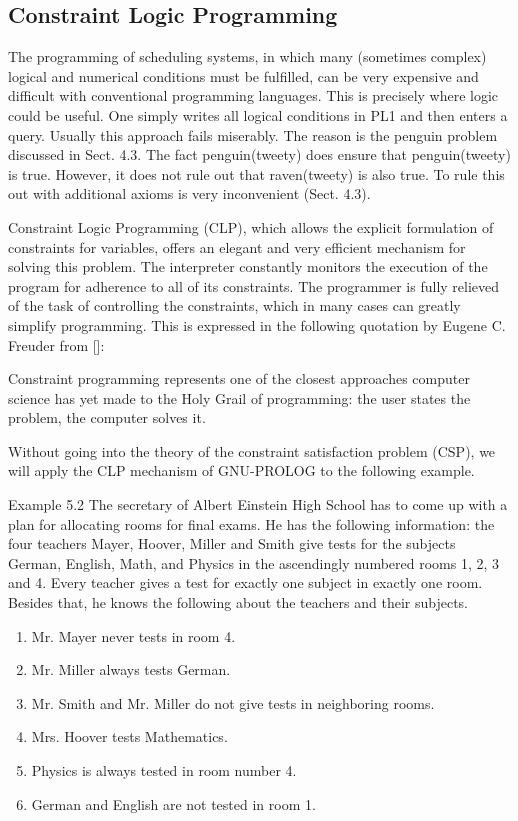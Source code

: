 \documentclass[10pt]{book}
\begin{document}
\subsection{Constraint Logic Programming}
The programming of scheduling systems, in which many (sometimes complex) logical and numerical conditions must be fulfilled, can be very expensive and difficult with conventional programming languages. This is precisely where logic could be useful. One simply writes all logical conditions in PL1 and then enters a query. Usually this approach fails miserably. The reason is the penguin problem discussed in Sect. 4.3. The fact penguin(tweety) does ensure that penguin(tweety) is true. However, it does not rule out that raven(tweety) is also true. To rule this out with additional axioms is very inconvenient (Sect. 4.3).

Constraint Logic Programming (CLP), which allows the explicit formulation of constraints for variables, offers an elegant and very efficient mechanism for solving this problem. The interpreter constantly monitors the execution of the program for adherence to all of its constraints. The programmer is fully relieved of the task of controlling the constraints, which in many cases can greatly simplify programming. This is expressed in the following quotation by Eugene C. Freuder from [\cite{freuder1997holy}]:
\begin{displayquote}
Constraint programming represents one of the closest approaches computer science has yet made to the Holy Grail of programming: the user states the problem, the computer solves it.
\end{displayquote}

Without going into the theory of the constraint satisfaction problem (CSP), we will apply the CLP mechanism of GNU-PROLOG to the following example.

Example 5.2 The secretary of Albert Einstein High School has to come up with a plan for allocating rooms for final exams. He has the following information: the four teachers Mayer, Hoover, Miller and Smith give tests for the subjects German, English, Math, and Physics in the ascendingly numbered rooms 1, 2, 3 and 4. Every teacher gives a test for exactly one subject in exactly one room. Besides that, he knows the following about the teachers and their subjects.

\begin{enumerate}
  \item Mr. Mayer never tests in room 4.
  \item Mr. Miller always tests German.
  \item Mr. Smith and Mr. Miller do not give tests in neighboring rooms.
  \item Mrs. Hoover tests Mathematics.
  \item Physics is always tested in room number 4.
  \item German and English are not tested in room 1.
\end{enumerate}
\end{document}
